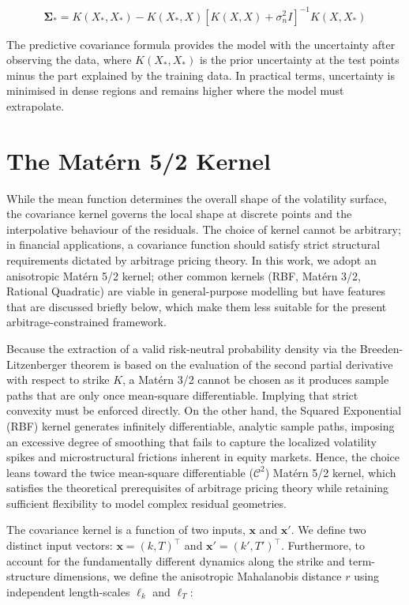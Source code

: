 \documentclass[12pt,oneside]{report}
\theoremstyle{definition}
\theoremstyle{remark}
\begin{document}
\[\boldsymbol{\Sigma}_* = K(X_*, X_*) - K(X_*, X)[K(X, X) + \sigma_n^2 I]^{-1}K(X, X_*)\]

The predictive covariance formula provides the model with the uncertainty after observing the data, where $K(X_*, X_*)$ is the prior uncertainty at the test points minus the part explained by the training data. In practical terms, uncertainty is minimised in dense regions and remains higher where the model must extrapolate.

\section{The Mat\'ern 5/2 Kernel}
While the mean function determines the overall shape of the volatility surface, the covariance kernel governs the local shape at discrete points and the interpolative behaviour of the residuals. The choice of kernel cannot be arbitrary; in financial applications, a covariance function should satisfy strict structural requirements dictated by arbitrage pricing theory. In this work, we adopt an anisotropic Matérn 5/2 kernel; other common kernels (RBF, Matérn 3/2, Rational Quadratic) are viable in general-purpose modelling but have features that are discussed briefly below, which make them less suitable for the present arbitrage-constrained framework. 

Because the extraction of a valid risk-neutral probability density via the Breeden-Litzenberger theorem is based on the evaluation of the second partial derivative with respect to strike $K$, a Matérn 3/2 cannot be chosen as it produces sample paths that are only once mean-square differentiable. Implying that strict convexity must be enforced directly. On the other hand, the Squared Exponential (RBF) kernel generates infinitely differentiable, analytic sample paths, imposing an excessive degree of smoothing that fails to capture the localized volatility spikes and microstructural frictions inherent in equity markets. Hence, the choice leans toward the twice mean-square differentiable ($\mathcal{C}^2$) Matérn 5/2 kernel, which satisfies the theoretical prerequisites of arbitrage pricing theory while retaining sufficient flexibility to model complex residual geometries. 

The covariance kernel is a function of two inputs, $\mathbf{x}$ and $\mathbf{x}'$. We define two distinct input vectors: $\mathbf{x} = (k, T)^{\top}$ and $\mathbf{x}' = (k', T')^{\top}$. Furthermore, to account for the fundamentally different dynamics along the strike and term-structure dimensions, we define the anisotropic Mahalanobis distance $r$ using independent length-scales $\ell_k$ and $\ell_T$:
\end{document}
